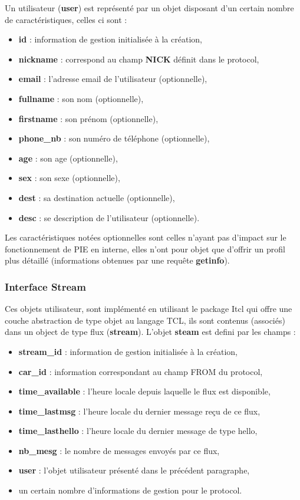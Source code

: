 Un utilisateur (\textbf{user}) est représenté par un objet disposant
d'un certain nombre de caractéristiques, celles ci sont : \\

\begin{itemize}
	\item \textbf{id} : information de gestion initialisée à la création,
	\item \textbf{nickname}	: correspond au champ \textbf{NICK} définit dans le protocol,
	\item \textbf{email} : l'adresse email de l'utilisateur (optionnelle),
	\item \textbf{fullname} : son nom (optionnelle),
	\item \textbf{firstname} : son prénom (optionnelle),
	\item \textbf{phone\_nb} : son numéro de téléphone (optionnelle),
	\item \textbf{age} : son age (optionnelle),
	\item \textbf{sex} : son sexe (optionnelle),
	\item \textbf{dest} : sa destination actuelle (optionnelle),
	\item \textbf{desc} : se description de l'utilisateur (optionnelle).\\
\end{itemize}

Les caractéristiques notées optionnelles sont celles n'ayant pas d'impact
sur le fonctionnement de PIE en interne, elles n'ont pour objet que d'offrir
un profil plus détaillé (informations obtenues par une requête \textbf{getinfo}).
 
\subsubsection{Interface Stream}

Ces objets utilisateur, sont implémenté en utilisant le package Itcl qui offre
une couche abstraction de type objet au langage TCL, ils sont contenus
(associés) dans un object de type flux (\textbf{stream}). L'objet \textbf{steam}
est defini par les champs : \\

\begin{itemize}
	\item \textbf{stream\_id} : information de gestion initialisée à la création,
	\item \textbf{car\_id} : information correspondant au champ FROM du protocol,
	\item \textbf{time\_available} : l'heure locale depuis laquelle le flux est disponible,
	\item \textbf{time\_lastmsg} : l'heure locale du dernier message reçu de ce flux,
	\item \textbf{time\_lasthello} : l'heure locale du dernier message de type hello,
	\item \textbf{nb\_mesg} : le nombre de messages envoyés par ce flux,
	\item \textbf{user} : l'objet utilisateur présenté dans le précédent paragraphe,
	\item un certain nombre d'informations de gestion pour le protocol.
\end{itemize}

